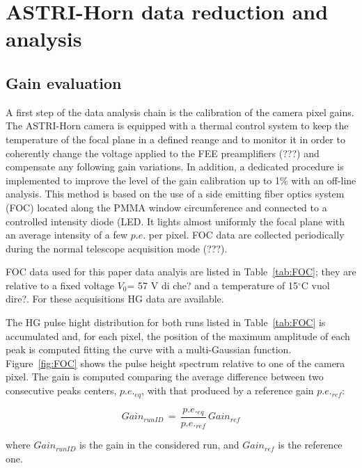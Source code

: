 \section{ASTRI-Horn data reduction and analysis} 
\label{sect:astridata}

\subsection{Gain evaluation}
\label{subs:gain}

A first step of the data analysis chain is the calibration of the camera pixel gains. 
The ASTRI-Horn camera is equipped with a thermal control system to keep the temperature of the focal plane in a defined reange and to monitor it in order to coherently change the voltage applied to the FEE preamplifiers (???) and compensate any following  gain variations. In addition, a dedicated procedure is implemented to improve the level of the gain calibration up to 1\% with an off-line analysis. This method is based on the use of a side emitting fiber optics system (FOC) located along the PMMA window circumference and connected to a controlled intensity diode (LED. It lights almost uniformly the focal plane with an average intensity of a few $p.e.$ per pixel. FOC data are collected periodically during the normal telescope acquisition mode (???).

FOC data used for this paper data analyis are listed in Table~\ref{tab:FOC}; they are relative to a fixed voltage $V_{0}$= 57 V {\tem di che?} and a temperature of 15$^\circ$C {\che vuol dire?}. For these acquisitions HG data are available.

The HG pulse hight distribution for both runs listed in Table~\ref{tab:FOC} is accumulated and, for each pixel, the position of the maximum amplitude of each peak is computed fitting the curve with a multi-Gaussian function. Figure~\ref{fig:FOC} shows the pulse height spectrum relative to one of the camera pixel. The gain is computed comparing the average difference between two consecutive peaks centers, $p.e._{eq}$, with that produced by a reference gain $p.e._{ref}$:

\begin{equation}
Gain_{run ID}\,=\,\frac{p.e._{eq}}{p.e._{ref}}\,Gain_{ref}
\end{equation}

\noindent
where $Gain_{run ID}$ is the gain in the considered run, and $Gain_{ref}$ is the reference one.


